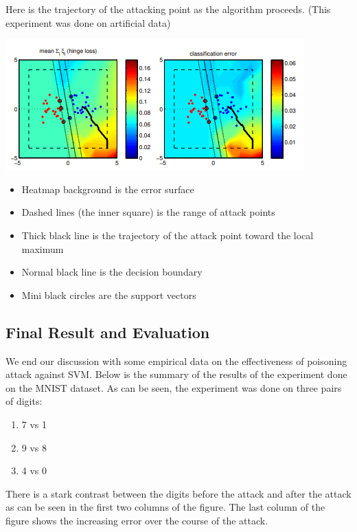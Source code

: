 \documentclass[twoside]{article}
\begin{document}
Here is the trajectory of the attacking point as the algorithm proceeds. (This experiment was done on artificial data)

\begin{center}
    \includegraphics[scale=1.4, inner]{poisontrajectory.PNG}
\end{center}

\begin{itemize}
  \item Heatmap background is the error surface
  \item Dashed lines (the inner square) is the range of attack points
  \item Thick black line is the trajectory of the attack point toward the local maximum
  \item Normal black line is the decision boundary
  \item Mini black circles are the support vectors
\end{itemize}

\subsection{Final Result and Evaluation}

We end our discussion with some empirical data on the effectiveness of poisoning attack against SVM. Below is the summary of the results of the experiment done on the MNIST dataset. As can be seen, the experiment was done on three pairs of digits:
\begin{enumerate}
    \item 7 vs 1
    \item 9 vs 8
    \item 4 vs 0
\end{enumerate}
There is a stark contrast between the digits before the attack and after the attack as can be seen in the first two columns of the figure. The last column of the figure shows the increasing error over the course of the attack. 
\end{document}
